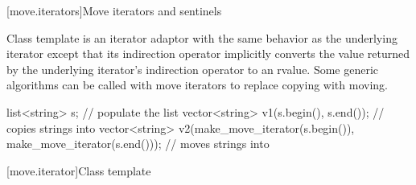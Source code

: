 [move.iterators]{Move iterators and sentinels}

\pnum
Class template  is an iterator adaptor
with the same behavior as the underlying iterator except that its
indirection operator implicitly converts the value returned by the
underlying iterator's indirection operator to an rvalue.
Some generic algorithms can be called with move iterators to replace
copying with moving.

\pnum
\begin{example}
\begin{codeblock}
list<string> s;
// populate the list 
vector<string> v1(s.begin(), s.end());          // copies strings into 
vector<string> v2(make_move_iterator(s.begin()),
                  make_move_iterator(s.end())); // moves strings into 
\end{codeblock}

\end{example}

[move.iterator]{Class template }

